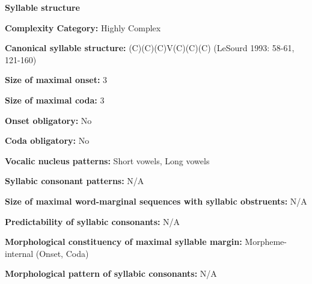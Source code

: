 \begin{styleBody}
\textbf{Syllable structure}
\end{styleBody}

\begin{styleBody}
\textbf{Complexity Category:} Highly Complex
\end{styleBody}

\begin{styleBody}
\textbf{Canonical syllable structure:} (C)(C)(C)V(C)(C)(C)\textbf{ }(LeSourd 1993: 58-61, 121-160)
\end{styleBody}

\begin{styleBody}
\textbf{Size of maximal onset:} 3
\end{styleBody}

\begin{styleBody}
\textbf{Size of maximal coda:} 3
\end{styleBody}

\begin{styleBody}
\textbf{Onset obligatory:} No
\end{styleBody}

\begin{styleBody}
\textbf{Coda obligatory:} No
\end{styleBody}

\begin{styleBody}
\textbf{Vocalic nucleus patterns:} Short vowels, Long vowels
\end{styleBody}

\begin{styleBody}
\textbf{Syllabic consonant patterns:} N/A
\end{styleBody}

\begin{styleBody}
\textbf{Size of maximal word{}-marginal sequences with syllabic obstruents:} N/A
\end{styleBody}

\begin{styleBody}
\textbf{Predictability of syllabic consonants:} N/A
\end{styleBody}

\begin{styleBody}
\textbf{Morphological constituency of maximal syllable margin:} Morpheme-internal (Onset, Coda)
\end{styleBody}

\begin{styleBody}
\textbf{Morphological pattern of syllabic consonants:} N/A
\end{styleBody}

